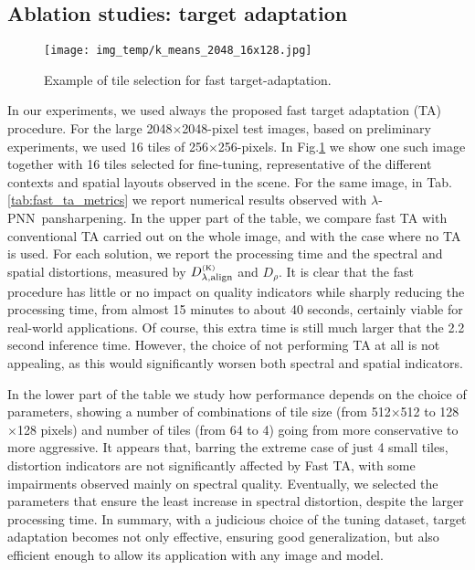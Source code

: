 \documentclass[journal]{IEEEtran}
\newcommand{\DLa}{D^{_{\rm (K)}}_{\lambda, \rm align}}
\newcommand{\DR} {D_{\rho}}
\newcommand{\LPNN}  {$\lambda$-PNN}
\begin{document}
\subsection{Ablation studies: target adaptation}

\begin{figure}
\centering
\texttt{[image: img\_temp/k\_means\_2048\_16x128.jpg]}
\caption{Example of tile selection for fast target-adaptation.}
\label{fig:k-means}
\end{figure}

In our experiments, we used always the proposed fast target adaptation (TA) procedure.
For the large 2048$\times$2048-pixel test images, based on preliminary experiments, we used 16 tiles of 256$\times$256-pixels.
In Fig.\ref{fig:k-means} we show one such image together with 16 tiles selected for fine-tuning, representative of the different contexts and spatial layouts observed in the scene.
For the same image, in Tab.\ref{tab:fast_ta_metrics} we report numerical results observed with \LPNN\ pansharpening.
In the upper part of the table, we compare
fast TA with conventional TA carried out on the whole image, and with the case where no TA is used.
For each solution, we report the processing time and the spectral and spatial distortions, measured by $\DLa$ and $\DR$.
It is clear that the fast procedure has little or no impact on quality indicators while sharply reducing the processing time,
from almost 15 minutes to about 40 seconds, certainly viable for real-world applications.
Of course, this extra time is still much larger that the 2.2 second inference time.
However, the choice of not performing TA at all is not appealing, as this would significantly worsen both spectral and spatial indicators.

In the lower part of the table we study how performance depends on the choice of parameters,
showing a number of combinations of tile size (from 512$\times$512 to 128$\times$128 pixels) and number of tiles (from 64 to 4)
going from more conservative to more aggressive.
It appears that, barring the extreme case of just 4 small tiles,
distortion indicators are not significantly affected by Fast TA, with some impairments observed mainly on spectral quality.
Eventually, we selected the parameters that ensure the least increase in spectral distortion, despite the larger processing time.
In summary,
with a judicious choice of the tuning dataset, target adaptation becomes not only effective, ensuring good generalization,
but also efficient enough to allow its application with any image and model.
\end{document}
